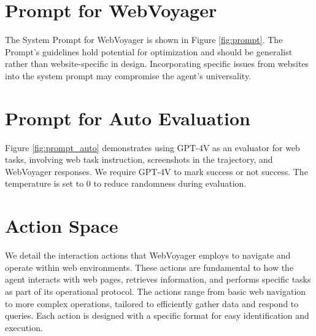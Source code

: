 \documentclass[11pt]{article}
\begin{document}
\clearpage
\appendix






\section{Prompt for WebVoyager}
\label{sec:appendixA}

The System Prompt for WebVoyager is shown in Figure \ref{fig:prompt}. The Prompt's guidelines hold potential for optimization and should be generalist rather than website-specific in design. Incorporating specific issues from websites into the system prompt may compromise the agent's universality. 


\section{Prompt for Auto Evaluation}\label{appendix:auto_eval}


Figure \ref{fig:prompt_auto} demonstrates using GPT-4V as an evaluator for web tasks, involving web task instruction, screenshots in the trajectory, and WebVoyager responses. We require GPT-4V to mark success or not success. The temperature is set to 0 to reduce randomness during evaluation. 


\section{Action Space}\label{sec:action_space}
We detail the interaction actions that WebVoyager employs to navigate and operate within web environments. These actions are fundamental to how the agent interacts with web pages, retrieves information, and performs specific tasks as part of its operational protocol. The actions range from basic web navigation to more complex operations, tailored to efficiently gather data and respond to queries. Each action is designed with a specific format for easy identification and execution. 
\end{document}
